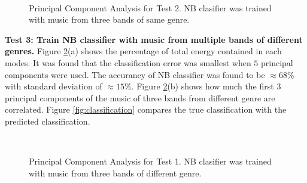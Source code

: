 \documentclass{article}
\begin{document}
\begin{figure}[!t]
\\
\caption{Principal Component Analysis for Test 2. NB clasifier was trained with music from three bands of same genre.}
\label{fig:test2}
\end{figure}

\textbf{Test 3: Train NB classifier with music from multiple bands of different genres.}
Figure \ref{fig:test3}(a) shows the percentage of total energy contained in each modes. It was found that the classification error was smallest when $5$ principal components were used. The accurancy of NB classifier was found to be $\approx 68 \%$ with standard deviation of $\approx 15 \%$. Figure \ref{fig:test3}(b) shows how much the first $3$ principal components of the music of three bands from different genre are correlated. Figure \ref{fig:classification} compares the true classification with the predicted classification. \\
 
\begin{figure}[!b]
\\
\caption{Principal Component Analysis for Test 1. NB clasifier was trained with music from three bands of different genre.}
\label{fig:test3}
\end{figure}
\end{document}
